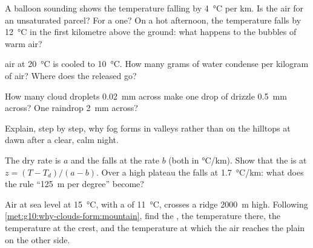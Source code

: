 \begin{exercise}[$\star\star$]\label{exo:g10:why-clouds-form:8}
A balloon sounding shows the temperature falling by \qty{4}{\degreeCelsius}
per km. Is the air  for an unsaturated parcel? For a  one?
On a hot afternoon, the temperature falls by \qty{12}{\degreeCelsius} in the
first kilometre above the ground: what happens to the bubbles of warm air?
\end{exercise}

\begin{exercise}[$\star\star$]\label{exo:g10:why-clouds-form:9}
 air at \qty{20}{\degreeCelsius} is cooled to
\qty{10}{\degreeCelsius}. How many grams of water condense per kilogram of
air? Where does the  released go?
\end{exercise}

\begin{exercise}[$\star\star$]\label{exo:g10:why-clouds-form:10}
How many cloud droplets \qty{0.02}{mm} across make one drop of drizzle
\qty{0.5}{mm} across? One raindrop \qty{2}{mm} across?
\end{exercise}

\begin{exercise}[$\star\star$]\label{exo:g10:why-clouds-form:11}
Explain, step by step, why fog forms in valleys rather than on the hilltops
at dawn after a clear, calm night.
\end{exercise}

\begin{exercise}[$\star\star\star$]\label{exo:g10:why-clouds-form:12}
The dry rate is $a$ and the  falls at the rate $b$ (both in
\unit{\degreeCelsius/km}). Show that the  is at
$z = (T - T_d)/(a - b)$. Over a high plateau the  falls at
\qty{1.7}{\degreeCelsius/km}: what does the rule ``\qty{125}{m} per degree''
become?
\end{exercise}

\begin{exercise}[$\star\star\star$]\label{exo:g10:why-clouds-form:13}
Air at sea level at \qty{15}{\degreeCelsius}, with a  of
\qty{11}{\degreeCelsius}, crosses a ridge \qty{2000}{m} high. Following
\cref{met:g10:why-clouds-form:mountain}, find the , the
temperature there, the temperature at the crest, and the temperature at
which the air reaches the plain on the other side.
\end{exercise}

